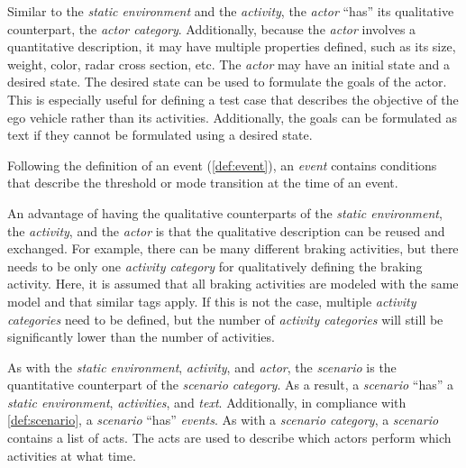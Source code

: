 \cbstart
Similar to the \textit{static environment} and the \textit{activity}, the \textit{actor} ``has'' its qualitative counterpart, the \textit{actor category}. Additionally, because the \textit{actor} involves a quantitative description, it may have multiple properties defined, such as its size, weight, color, radar cross section, etc. The \textit{actor} may have an initial state and a desired state. The desired state can be used to formulate the goals of the actor. This is especially useful for defining a test case that describes the objective of the ego vehicle rather than its activities. Additionally, the goals can be formulated as text if they cannot be formulated using a desired state.
\cbend

\cbstartd
Following the definition of an event (\cref{def:event}), an \textit{event} contains conditions that describe the threshold or mode transition at the time of an event.
\cbend

An advantage of having the qualitative counterparts of the \textit{static environment}, the \textit{activity}, and the \textit{actor} is that the qualitative description can be reused and exchanged. For example, there can be many different braking activities, but there needs to be only one \textit{activity category} for qualitatively defining the braking activity. Here, it is assumed that all braking activities are modeled with the same model and that similar tags apply. If this is not the case, multiple \textit{activity categories} need to be defined, but the number of \textit{activity categories} will still be significantly lower than the number of activities.

As with the \textit{static environment}, \textit{activity}, and \textit{actor}, the \textit{scenario} is the quantitative counterpart of the \textit{scenario category}. As a result, a \textit{scenario} ``has'' a \textit{static environment}, \textit{activities}, and \textit{text}. Additionally, in compliance with \cref{def:scenario}, a \textit{scenario} ``has'' \textit{events}. As with a \textit{scenario category}, a \textit{scenario} contains a list of acts.
The acts are used to describe which actors perform which activities at what time.\cbend
